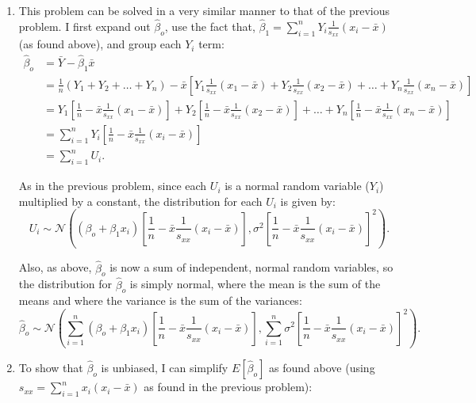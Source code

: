 \begin{problem}{24}$ $
\begin{enumerate}

\item This problem can be solved in a very similar manner to that of the previous problem.  I first expand out $\hat \beta_o$, use the fact that, $\hat \beta_1 = \sum_{i=1}^n Y_i \frac{1}{s_{xx}}(x_i-\bar x)$ (as found above), and group each $Y_i$ term:
\begin{align*}
\hat \beta_o &= \bar Y -\hat \beta_1 \bar x \\
& = \frac{1}{n}(Y_1+Y_2+\ldots+Y_n) - \bar x \left [Y_1 \frac{1}{s_{xx}}(x_1-\bar x)+Y_2 \frac{1}{s_{xx}}(x_2-\bar x)+\ldots +Y_n \frac{1}{s_{xx}}(x_n-\bar x) \right] \\
& = Y_1 \left[\frac{1}{n} -\bar x \frac{1}{s_{xx}} (x_1-\bar x)\right ]+Y_2 \left[\frac{1}{n} -\bar x \frac{1}{s_{xx}} (x_2-\bar x)\right ]+\ldots+Y_n \left[\frac{1}{n} -\bar x \frac{1}{s_{xx}} (x_n-\bar x)\right ] \\
& = \sum_{i=1}^n Y_i \left[\frac{1}{n} -\bar x \frac{1}{s_{xx}} (x_i-\bar x)\right ] \\
& = \sum_{i=1}^n U_i .
\end{align*}

As in the previous problem, since each $U_i$ is a normal random variable ($Y_i$) multiplied by a constant, the distribution for each $U_i$ is given by:
\begin{equation*}
U_i \sim \mathcal N \left ((\beta_o+\beta_1x_i)\left[\frac{1}{n} -\bar x \frac{1}{s_{xx}} (x_i-\bar x)\right ], \sigma^2 \left[\frac{1}{n} -\bar x \frac{1}{s_{xx}} (x_i-\bar x)\right ]^2 \right).
\end{equation*}

Also, as above, $\hat \beta_o$ is now a sum of independent, normal random variables, so the distribution for $\hat \beta_o$ is simply normal, where the mean is the sum of the means and where the variance is the sum of the variances:
\begin{equation*}
\hat \beta_o  \sim \mathcal N \left ( \sum_{i=1}^n (\beta_o+\beta_1x_i)\left[\frac{1}{n} -\bar x \frac{1}{s_{xx}} (x_i-\bar x)\right ],  \sum_{i=1}^n \sigma^2 \left[\frac{1}{n} -\bar x \frac{1}{s_{xx}} (x_i-\bar x)\right ]^2 \right).
\end{equation*}

\item To show that $\hat \beta_o$ is unbiased, I can simplify $E[\hat \beta_o]$ as found above (using $s_{xx} = \sum_{i=1}^n x_i(x_i-\bar x )$ as found in the previous problem):


\end{enumerate}
\end{problem}
